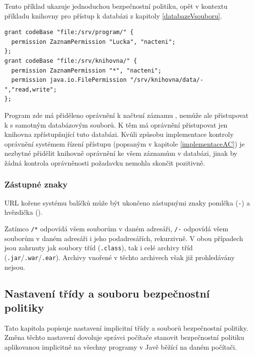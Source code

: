 Tento příklad ukazuje jednoduchou bezpečnostní politiku, opět v kontextu příkladu knihovny pro přístup k databázi z kapitoly \ref{databazeVsouboru}.

\begin{lstlisting}[caption=Příklad souboru bezpečnostní politiky, label=prikladSouboruBP]
grant codeBase "file:/srv/program/" {
  permission ZaznamPermission "Lucka", "nacteni";
};
grant codeBase "file:/srv/knihovna/" {
  permission ZaznamPermission "*", "nacteni";
  permission java.io.FilePermission "/srv/knihovna/data/-","read,write";
};
\end{lstlisting}

Program zde má přiděleno oprávnění k načtení záznamu , nemůže ale přistupovat k s samotným databázovým souborů. K těm má oprávnění přistupovat jen knihovna zpřístupňující tuto databázi. Kvůli způsobu implementace kontroly oprávnění systémem řízení přístupu (popsaným v kapitole \ref{implementaceAC}) je nezbytné přidělit knihovně oprávnění ke všem záznamům v databázi, jinak by žádná kontrola oprávněnosti požadavku nemohla skončit pozitivně.

\subsubsection{Zástupné znaky}

URL kořene systému balíčků může být ukončeno zástupnými znaky pomlčka ({\tt -}) a hvězdička ({\tt *}).

Zatímco {\tt /*} odpovídá všem souborům v daném adresáři, {\tt /-} odpovídá všem souborům v daném adresáři i jeho podadresářích, rekurzivně.
V obou případech jsou zahrnuty jak soubory tříd ({\tt .class}), tak i celé archivy tříd ({\tt .jar}/{\tt .war}/{\tt .ear}).
Archivy vnořené v těchto archivech však již prohledávány nejsou.
\cite{jdkdocPolicyFiles}

\subsection{Nastavení třídy a souboru bezpečnostní politiky} \label{nastaveniPolitiky}

Tato kapitola popisuje nastavení implicitní třídy a souborů bezpečnostní politiky. Změna těchto nastavení dovoluje správci počítače
stanovit bezpečnostní politiku aplikovanou implicitně na všechny programy v Javě běžící na daném počítači.

